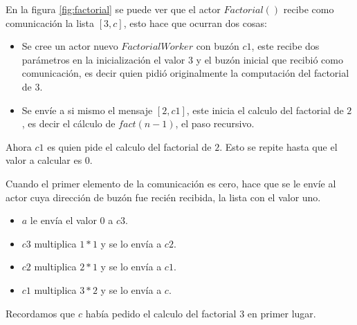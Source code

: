 En la figura \ref{fig:factorial} se puede ver que el actor $Factorial()$ recibe como comunicación la lista $[3,c]$, esto hace que ocurran dos cosas:

\begin{itemize}
\item Se cree un actor nuevo $FactorialWorker$ con buzón $c1$, este recibe dos parámetros en la inicialización el valor $3$ y el buzón inicial que recibió como comunicación, es decir quien pidió originalmente la computación del factorial de $3$.

\item Se envíe a si mismo el mensaje $[2,c1]$, este inicia el calculo del factorial de $2$, es decir el cálculo de $fact(n-1)$, el paso recursivo.
\end{itemize}

Ahora $c1$ es quien pide el calculo del factorial de $2$. Esto se repite hasta que el valor a calcular es $0$.

Cuando el primer elemento de la comunicación es cero, hace que se le envíe al actor cuya dirección de buzón fue recién recibida, la lista con el valor uno. 

\begin{itemize}
\item $a$ le envía el valor $0$ a $c3$.
\item $c3$ multiplica $1*1$ y se lo envía a $c2$.
\item $c2$ multiplica $2*1$ y se lo envía a $c1$.
\item $c1$ multiplica $3*2$ y se lo envía a $c$.
\end{itemize}

Recordamos que $c$ había pedido el calculo del factorial $3$ en primer lugar.

